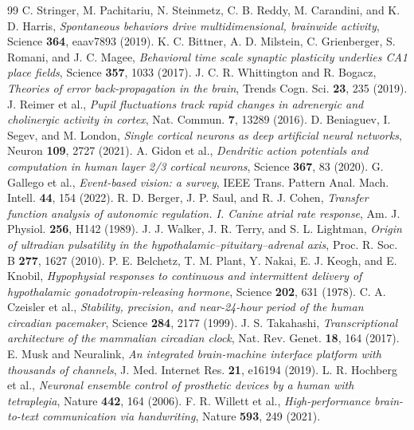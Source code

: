 \begin{thebibliography}{99}
 C. Stringer, M. Pachitariu, N. Steinmetz, C. B. Reddy, M. Carandini, and K. D. Harris, \emph{Spontaneous behaviors drive multidimensional, brainwide activity}, Science \textbf{364}, eaav7893 (2019).
 K. C. Bittner, A. D. Milstein, C. Grienberger, S. Romani, and J. C. Magee, \emph{Behavioral time scale synaptic plasticity underlies CA1 place fields}, Science \textbf{357}, 1033 (2017).
 J. C. R. Whittington and R. Bogacz, \emph{Theories of error back-propagation in the brain}, Trends Cogn. Sci. \textbf{23}, 235 (2019).
 J. Reimer et al., \emph{Pupil fluctuations track rapid changes in adrenergic and cholinergic activity in cortex}, Nat. Commun. \textbf{7}, 13289 (2016).
 D. Beniaguev, I. Segev, and M. London, \emph{Single cortical neurons as deep artificial neural networks}, Neuron \textbf{109}, 2727 (2021).
 A. Gidon et al., \emph{Dendritic action potentials and computation in human layer 2/3 cortical neurons}, Science \textbf{367}, 83 (2020).
 G. Gallego et al., \emph{Event-based vision: a survey}, IEEE Trans. Pattern Anal. Mach. Intell. \textbf{44}, 154 (2022).
 R. D. Berger, J. P. Saul, and R. J. Cohen, \emph{Transfer function analysis of autonomic regulation. I. Canine atrial rate response}, Am. J. Physiol. \textbf{256}, H142 (1989).
 J. J. Walker, J. R. Terry, and S. L. Lightman, \emph{Origin of ultradian pulsatility in the hypothalamic--pituitary--adrenal axis}, Proc. R. Soc. B \textbf{277}, 1627 (2010).
 P. E. Belchetz, T. M. Plant, Y. Nakai, E. J. Keogh, and E. Knobil, \emph{Hypophysial responses to continuous and intermittent delivery of hypothalamic gonadotropin-releasing hormone}, Science \textbf{202}, 631 (1978).
 C. A. Czeisler et al., \emph{Stability, precision, and near-24-hour period of the human circadian pacemaker}, Science \textbf{284}, 2177 (1999).
 J. S. Takahashi, \emph{Transcriptional architecture of the mammalian circadian clock}, Nat. Rev. Genet. \textbf{18}, 164 (2017).
 E. Musk and Neuralink, \emph{An integrated brain-machine interface platform with thousands of channels}, J. Med. Internet Res. \textbf{21}, e16194 (2019).
 L. R. Hochberg et al., \emph{Neuronal ensemble control of prosthetic devices by a human with tetraplegia}, Nature \textbf{442}, 164 (2006).
 F. R. Willett et al., \emph{High-performance brain-to-text communication via handwriting}, Nature \textbf{593}, 249 (2021).

\end{thebibliography}
